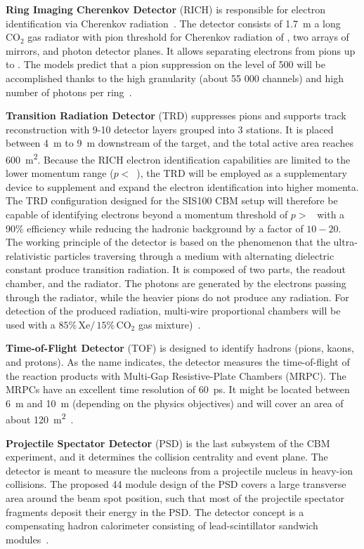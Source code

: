 \textbf{Ring Imaging Cherenkov Detector} (\gls{RICH}) is responsible for electron identification via Cherenkov radiation~\cite{RICH}. The detector consists of \SI{1.7}{\metre} a long $\mathrm{CO_{2}}$ gas radiator with pion threshold for Cherenkov radiation of , two arrays of mirrors, and photon detector planes. It allows separating electrons from pions up to . The models predict that a pion suppression on the level of 500 will be accomplished thanks to the high granularity (about 55 000 channels) and high number of photons per ring~\cite{RICH}.\bigbreak

\textbf{Transition Radiation Detector} (\gls{TRD}) suppresses pions and  supports track reconstruction with 9-10 detector layers grouped into 3 stations. It is placed between \SI{4}{\metre} to \SI{9}{\metre} downstream of the target, and the total active area reaches \SI{600}{\square\metre}. Because the RICH electron identification capabilities are limited to the lower momentum range ($p < $~), the TRD will be employed as a supplementary device to supplement and expand the electron identification into higher momenta. The TRD configuration designed for the SIS100 CBM setup will therefore be capable of identifying electrons beyond a momentum threshold of $p > $~ with a 90\% efficiency while reducing the hadronic background by a factor of $10 - 20$. The working principle of the detector is based on the phenomenon that the ultra-relativistic particles traversing through a medium with alternating dielectric constant produce transition radiation. It is composed of two parts, the readout chamber, and the radiator. The photons are generated by the electrons passing through the radiator, while the heavier pions do not produce any radiation. For detection of the produced radiation, multi-wire proportional chambers will be used with a $\mathrm{85\%\,Xe/\,15\%\,CO_{2}}$ gas mixture)~\cite{TRD}. \bigbreak

\textbf{Time-of-Flight Detector} (\gls{TOF}) is designed to identify hadrons (pions, kaons, and protons). As the name indicates, the detector measures the time-of-flight of the reaction products with Multi-Gap Resistive-Plate Chambers (\gls{MRPC}). The \glspl{MRPC} have an excellent time resolution of \SI{60}{\pico\second}.  It might be located between \SI{6}{\metre} and \SI{10}{\metre} (depending on the physics objectives) and will cover an area of about \SI{120}{\square\metre}~\cite{TOF}. \bigbreak

\textbf{Projectile Spectator Detector} (\gls{PSD}) is the last subsystem of the \gls{CBM} experiment, and it determines the collision centrality and event plane. The detector is meant to measure the nucleons from a projectile nucleus in heavy-ion collisions. The proposed 44 module design of the PSD covers a large transverse area around the beam spot position, such that most of the projectile spectator fragments deposit their energy in the \gls{PSD}. The detector concept is a compensating hadron calorimeter consisting of lead-scintillator sandwich modules~\cite{PSD}.\bigbreak


